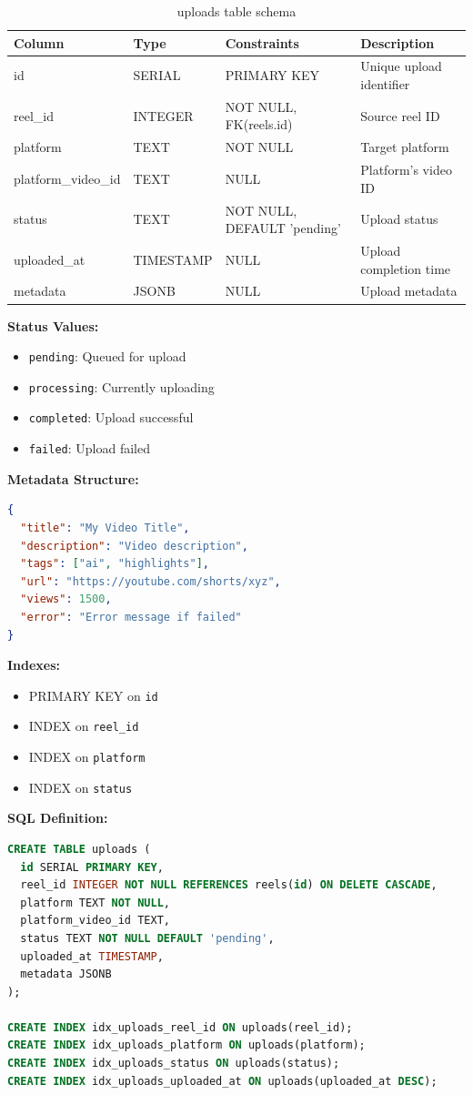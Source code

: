 \begin{table}[h]
\centering
\begin{tabular}{|l|l|l|p{4cm}|}
\hline
\textbf{Column} & \textbf{Type} & \textbf{Constraints} & \textbf{Description} \\
\hline
id & SERIAL & PRIMARY KEY & Unique upload identifier \\
reel\_id & INTEGER & NOT NULL, FK(reels.id) & Source reel ID \\
platform & TEXT & NOT NULL & Target platform \\
platform\_video\_id & TEXT & NULL & Platform's video ID \\
status & TEXT & NOT NULL, DEFAULT 'pending' & Upload status \\
uploaded\_at & TIMESTAMP & NULL & Upload completion time \\
metadata & JSONB & NULL & Upload metadata \\
\hline
\end{tabular}
\caption{uploads table schema}
\end{table}

\textbf{Status Values:}
\begin{itemize}
    \item \texttt{pending}: Queued for upload
    \item \texttt{processing}: Currently uploading
    \item \texttt{completed}: Upload successful
    \item \texttt{failed}: Upload failed
\end{itemize}

\textbf{Metadata Structure:}
\begin{lstlisting}[language=JSON]
{
  "title": "My Video Title",
  "description": "Video description",
  "tags": ["ai", "highlights"],
  "url": "https://youtube.com/shorts/xyz",
  "views": 1500,
  "error": "Error message if failed"
}
\end{lstlisting}

\textbf{Indexes:}
\begin{itemize}
    \item PRIMARY KEY on \texttt{id}
    \item INDEX on \texttt{reel\_id}
    \item INDEX on \texttt{platform}
    \item INDEX on \texttt{status}
\end{itemize}

\textbf{SQL Definition:}
\begin{lstlisting}[language=SQL]
CREATE TABLE uploads (
  id SERIAL PRIMARY KEY,
  reel_id INTEGER NOT NULL REFERENCES reels(id) ON DELETE CASCADE,
  platform TEXT NOT NULL,
  platform_video_id TEXT,
  status TEXT NOT NULL DEFAULT 'pending',
  uploaded_at TIMESTAMP,
  metadata JSONB
);

CREATE INDEX idx_uploads_reel_id ON uploads(reel_id);
CREATE INDEX idx_uploads_platform ON uploads(platform);
CREATE INDEX idx_uploads_status ON uploads(status);
CREATE INDEX idx_uploads_uploaded_at ON uploads(uploaded_at DESC);
\end{lstlisting}

